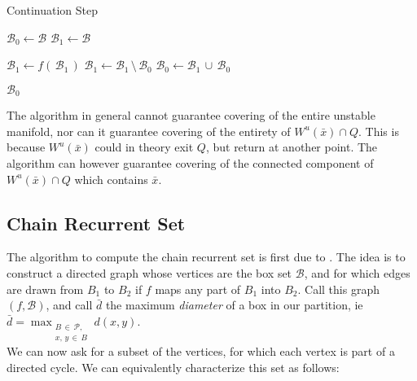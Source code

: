\begin{algorithm}
    \caption{Continuation Step}
    \label{alg:manifold}

    \begin{algorithmic}[1]
        \State $\mathcal{B}_0 \gets \mathcal{B}$
        \State $\mathcal{B}_1 \gets \mathcal{B}$

            \State $\mathcal{B}_1 \gets f(\,\mathcal{B}_1\,)$
            \State $\mathcal{B}_1 \gets \mathcal{B}_1\, \setminus\, \mathcal{B}_0$
            \State $\mathcal{B}_0 \gets \mathcal{B}_1\, \cup\, \mathcal{B}_0$
        \EndWhile

        \State \Return $\mathcal{B}_0$
    \end{algorithmic}
\end{algorithm}

\begin{proposition}
    \cite*{manifold} The algorithm in general cannot guarantee covering of the 
    entire unstable manifold, nor can it guarantee covering of the entirety of 
    $W^u(\bar{x}) \cap Q$. This is because $W^u(\bar{x})$ could in theory exit $Q$, 
    but return at another point. The algorithm can however guarantee covering 
    of the connected component of $W^u(\bar{x}) \cap Q$ which contains $\bar{x}$.
\end{proposition}
    

\subsection{Chain Recurrent Set}

The algorithm to compute the chain recurrent set is first due to \cite*{chain}. The idea 
is to construct a directed graph whose vertices are the box set $\mathcal{B}$, and for 
which edges are drawn from $B_1$ to $B_2$ if $f$ maps any part of $B_1$ into $B_2$. 
Call this graph $(f, \mathcal{B})$, and call $\bar{d}$ the maximum 
\emph{diameter} of a box in our partition, ie 
$\bar{d} = \max_{\substack{B\, \in\, \mathcal{P},\\ x,\, y\, \in\, B}} d(x, y)$.\\ 

We can now ask for a subset of the vertices, for which each vertex is part of a directed cycle. 
We can equivalently characterize this set as follows:

